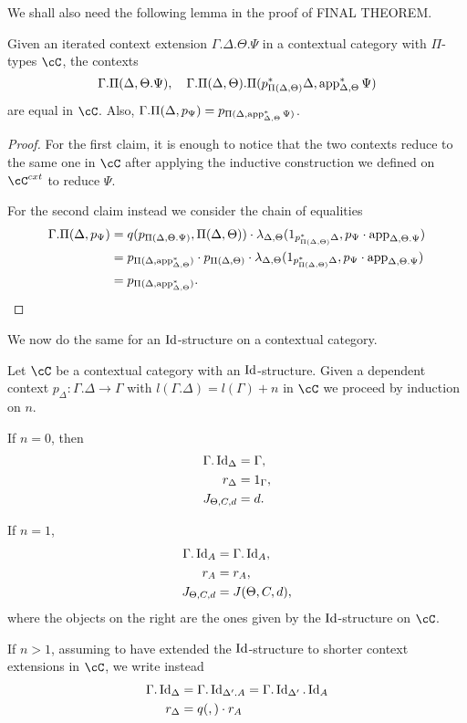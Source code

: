 We shall also need the following lemma in the proof of FINAL THEOREM.

\begin{lem}
  Given an iterated context extension $\Gamma.\Delta.\Theta.\Psi$ in a
  contextual category with $\Pi$-types $\cC$, the contexts
  \[\Gamma.\Pi(\Delta,\Theta.\Psi),\quad\Gamma.\Pi(\Delta,\Theta).\Pi(p^*_{\Pi(\Delta,\Theta)}\Delta,\operatorname{app}^*_{\Delta,\Theta}\Psi)\]
  are equal in $\cC$. Also,
  $\Gamma.\Pi(\Delta,p_{\Psi})=p_{\Pi(\Delta,\operatorname{app}^*_{\Delta,\Theta}\Psi)}$.
\end{lem}
\begin{proof}
  For the first claim, it is enough to notice that the two contexts reduce to
  the same one in $\cC$ after applying the inductive construction we defined on
  $\cC^{cxt}$ to reduce $\Psi$.

  For the second claim instead we consider the chain of equalities
  \begin{align*}
    \Gamma.\Pi(\Delta,p_{\Psi})
    &=q(p_{\Pi(\Delta,\Theta.\Psi)},\Pi(\Delta,\Theta))\cdot
    \lambda_{\Delta,\Theta}(1_{p^*_{\Pi(\Delta,\Theta)}\Delta},p_\Psi\cdot\operatorname{app}_{\Delta,\Theta.\Psi}) \\
    &=p_{\Pi(\Delta,\operatorname{app}^*_{\Delta,\Theta})}\cdot
    p_{\Pi(\Delta,\Theta)}\cdot
    \lambda_{\Delta,\Theta}(1_{p^*_{\Pi(\Delta,\Theta)}\Delta},p_\Psi\cdot\operatorname{app}_{\Delta,\Theta.\Psi}) \\
    &=p_{\Pi(\Delta,\operatorname{app}^*_{\Delta,\Theta})}.
  \end{align*}
\end{proof}

We now do the same for an $\operatorname{Id}$-structure on a contextual category.

\begin{construction}
  Let $\cC$ be a contextual category with an $\operatorname{Id}$-structure. Given a dependent
  context $p_\Delta\colon\Gamma.\Delta\rightarrow\Gamma$ with
  $l(\Gamma.\Delta)=l(\Gamma)+n$ in $\cC$ we proceed by induction on $n$.

  If $n=0$, then
  \begin{align*}
    \Gamma.\operatorname{Id}_\Delta &=\Gamma, \\
    r_\Delta &=1_\Gamma, \\
    J_{\Theta,C,d} &=d.
  \end{align*}

  If $n=1$,
  \begin{align*}
    \Gamma.\operatorname{Id}_A &=\Gamma.\operatorname{Id}_A, \\
    r_A &=r_A, \\
    J_{\Theta,C,d} &=J(\Theta,C,d),
  \end{align*}
  where the objects on the right are the ones given by the $\operatorname{Id}$-structure on
  $\cC$.

  If $n>1$, assuming to have extended the $\operatorname{Id}$-structure to shorter context
  extensions in $\cC$, we write instead
  \begin{align*}
    \Gamma.\operatorname{Id}_{\Delta} &=\Gamma.\operatorname{Id}_{\Delta'.A}=\Gamma.\operatorname{Id}_{\Delta'}.\operatorname{Id}_A \\
    r_{\Delta} &= q(,)\cdot r_A
  \end{align*}
\end{construction}

